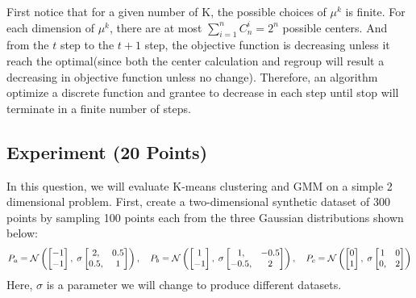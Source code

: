 \begin{enumerate}
\begin{soln}
    First notice that for a given number of K, the possible choices of $\mu^k$ is finite. For each dimension of $\mu^k$, there are at most $\sum_{i=1}^{n} C_{n}^{i}=2^n$ possible centers. And from the $t$ step to the $t+1$ step, the objective function is decreasing unless it reach the optimal(since both the center calculation and regroup will result a decreasing in objective function unless no change).   
    Therefore, an algorithm optimize a discrete function and grantee to decrease in each step until stop will terminate in a finite number of steps.
\end{soln}

\end{enumerate}



\subsection{Experiment (20 Points)}

In this question, we will evaluate
K-means clustering and GMM on a simple 2 dimensional problem.
First, create a two-dimensional synthetic dataset of 300 points by sampling 100 points each from the
three Gaussian distributions shown below:
\[
P_a = \mathcal{N}\left(
\begin{bmatrix}
-1 \\ -1
\end{bmatrix},
\;
\sigma\begin{bmatrix}
2, &0.5 \\ 0.5, &1
\end{bmatrix}
\right),
\quad
P_b = \mathcal{N}\left(
\begin{bmatrix}
1 \\ -1
\end{bmatrix},
\;
 \sigma\begin{bmatrix}
1, &-0.5 \\ -0.5, &2
\end{bmatrix}
\right),
\quad
P_c = \mathcal{N}\left(
\begin{bmatrix}
0 \\ 1
\end{bmatrix},
\;
 \sigma\begin{bmatrix}
1 &0 \\ 0, &2
\end{bmatrix}
\right)
\]
Here, $\sigma$ is a parameter we will change to produce different datasets.

